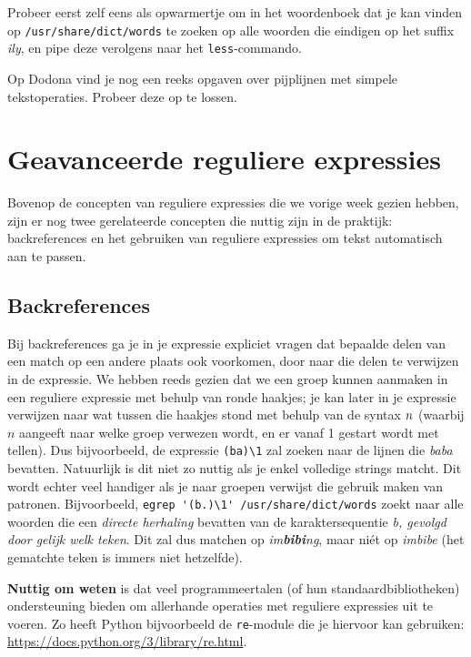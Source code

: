 \documentclass[a4paper,twoside,openany]{memoir}
\begin{document}
Probeer eerst zelf eens als opwarmertje om in het woordenboek dat je kan vinden
op \verb!/usr/share/dict/words! te zoeken op alle woorden die eindigen op het
suffix \emph{ily}, en pipe deze verolgens naar het \verb!less!-commando.

Op Dodona vind je nog een reeks opgaven over pijplijnen met simpele
tekstoperaties. Probeer deze op te lossen.

\chapter{Geavanceerde reguliere expressies}

Bovenop de concepten van reguliere expressies die we vorige week gezien hebben,
zijn er nog twee gerelateerde concepten die nuttig zijn in de praktijk:
backreferences en het gebruiken van reguliere expressies om tekst automatisch
aan te passen.

\section{Backreferences}

Bij backreferences ga je in je expressie expliciet vragen dat bepaalde delen van
een match op een andere plaats ook voorkomen, door naar die delen te verwijzen
in de expressie. We hebben reeds gezien dat we een groep kunnen aanmaken in een
reguliere expressie met behulp van ronde haakjes; je kan later in je expressie
verwijzen naar wat tussen die haakjes stond met behulp van de syntax  $\\n$
(waarbij $n$ aangeeft naar welke groep verwezen wordt, en er vanaf 1 gestart
wordt met tellen). Dus bijvoorbeeld, de expressie \verb!(ba)\1! zal zoeken naar
de lijnen die \emph{baba} bevatten. Natuurlijk is dit niet zo nuttig als je
enkel volledige strings matcht. Dit wordt echter veel handiger als je naar
groepen verwijst die gebruik maken van patronen. Bijvoorbeeld, \verb!egrep '(b.)\1' /usr/share/dict/words! zoekt naar alle woorden die een \emph{directe
herhaling} bevatten van de karaktersequentie \emph{b, gevolgd door gelijk welk
teken}. Dit zal dus matchen op \emph{im\textbf{bibi}ng}, maar niét op
\emph{imbibe} (het gematchte teken is immers niet hetzelfde).

\textbf{Nuttig om weten} is dat veel programmeertalen (of hun
standaardbibliotheken) ondersteuning bieden om allerhande operaties met
reguliere expressies uit te voeren. Zo heeft Python bijvoorbeeld de
\verb!re!-module die je hiervoor kan gebruiken:
\url{https://docs.python.org/3/library/re.html}.
\end{document}
